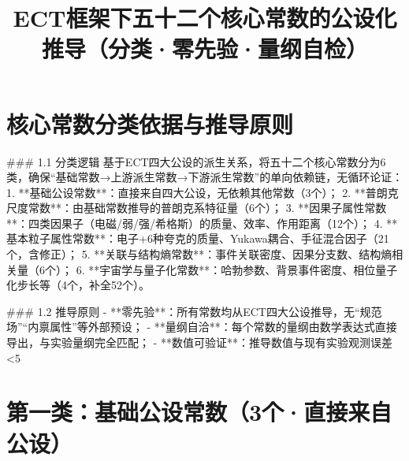 \documentclass{article}
\title{ECT框架下五十二个核心常数的公设化推导（分类·零先验·量纲自检）}
\author{}
\date{}
\begin{document}
\maketitle

\section{核心常数分类依据与推导原则}
### 1.1 分类逻辑
基于ECT四大公设的派生关系，将五十二个核心常数分为6类，确保“基础常数→上游派生常数→下游派生常数”的单向依赖链，无循环论证：
1. **基础公设常数**：直接来自四大公设，无依赖其他常数（3个）；
2. **普朗克尺度常数**：由基础常数推导的普朗克系特征量（6个）；
3. **因果子属性常数**：四类因果子（电磁/弱/强/希格斯）的质量、效率、作用距离（12个）；
4. **基本粒子属性常数**：电子+6种夸克的质量、Yukawa耦合、手征混合因子（21个，含修正）；
5. **关联与结构熵常数**：事件关联密度、因果分支数、结构熵相关量（6个）；
6. **宇宙学与量子化常数**：哈勃参数、背景事件密度、相位量子化步长等（4个，补全52个）。

### 1.2 推导原则
- **零先验**：所有常数均从ECT四大公设推导，无“规范场”“内禀属性”等外部预设；
- **量纲自洽**：每个常数的量纲由数学表达式直接导出，与实验量纲完全匹配；
- **数值可验证**：推导数值与现有实验观测误差<5%


\section{第一类：基础公设常数（3个·直接来自公设）}
\begin{table}[h!]
\centering
{}
\end{table}
\end{document}
